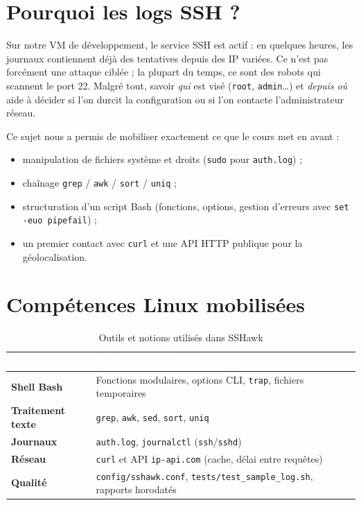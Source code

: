 \documentclass[11pt,a4paper]{article}
\newcommand{\tableheadrow}{\rowcolor{tablehead}}
\newcommand{\tableheadcell}[1]{\textcolor{white}{\bfseries #1}}
\begin{document}
\section{Pourquoi les logs SSH ?}

Sur notre VM de développement, le service SSH est actif : en quelques heures, les journaux contiennent déjà
des tentatives depuis des IP variées. Ce n'est pas forcément une attaque ciblée ; la plupart du temps, ce sont
des robots qui scannent le port 22. Malgré tout, savoir \emph{qui} est visé (\texttt{root}, \texttt{admin}\ldots)
et \emph{depuis où} aide à décider si l'on durcit la configuration ou si l'on contacte l'administrateur réseau.

Ce sujet nous a permis de mobiliser exactement ce que le cours met en avant :
\begin{itemize}[leftmargin=*]
  \item manipulation de fichiers système et droits (\texttt{sudo} pour \texttt{auth.log}) ;
  \item chaînage \texttt{grep} / \texttt{awk} / \texttt{sort} / \texttt{uniq} ;
  \item structuration d'un script Bash (fonctions, options, gestion d'erreurs avec \texttt{set -euo pipefail}) ;
  \item un premier contact avec \texttt{curl} et une API HTTP publique pour la géolocalisation.
\end{itemize}

\section{Compétences Linux mobilisées}

\begin{table}[H]
  \centering
  \caption{Outils et notions utilisés dans SSHawk}
  \begin{tabular}{@{}p{2.8cm}p{10cm}@{}}
    \tableheadrow
    \tableheadcell{Domaine} & \tableheadcell{Utilisation dans SSHawk} \\
    \midrule
    \textbf{Shell Bash} & Fonctions modulaires, options CLI, \texttt{trap}, fichiers temporaires \\
    \textbf{Traitement texte} & \texttt{grep}, \texttt{awk}, \texttt{sed}, \texttt{sort}, \texttt{uniq} \\
    \textbf{Journaux} & \texttt{auth.log}, \texttt{journalctl} (\texttt{ssh}/\texttt{sshd}) \\
    \textbf{Réseau} & \texttt{curl} et API \texttt{ip-api.com} (cache, délai entre requêtes) \\
    \textbf{Qualité} & \texttt{config/sshawk.conf}, \texttt{tests/test\_sample\_log.sh}, rapports horodatés \\
    \bottomrule
  \end{tabular}
\end{table}
\end{document}
